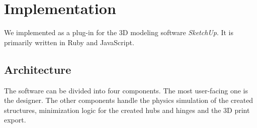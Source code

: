\chapter{Implementation}\label{ch:implementation}
We implemented \trussFabName{} as a plug-in for the 3D modeling software \textit{SketchUp}. It is primarily written in Ruby and JavaScript.

\section{Architecture}
The software can be divided into four components. The most user-facing one is the designer. The other components handle the physics simulation of the created structures, minimization logic for the created hubs and hinges and the 3D print export.\\
\\
